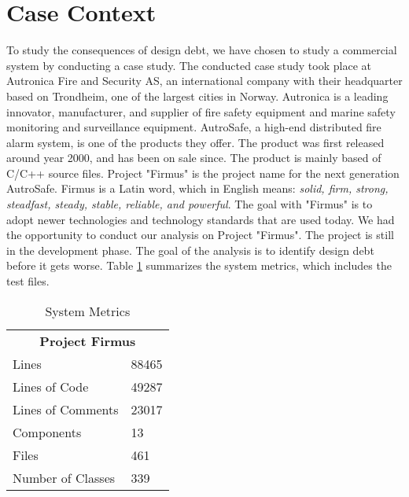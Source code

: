 \section{Case Context}
\label{sec:casecontext}
To study the consequences of design debt, we have chosen to study a commercial system by conducting a case study. The conducted case study took place at Autronica Fire and Security AS, an international company with their headquarter based on Trondheim, one of the largest cities in Norway. Autronica is a leading innovator, manufacturer, and supplier of fire safety equipment and marine safety monitoring and surveillance equipment. AutroSafe, a high-end distributed fire alarm system, is one of the products they offer. The product was first released around year 2000, and has been on sale since. The product is mainly based of C/C++ source files. Project "Firmus" is the project name for the next generation AutroSafe. Firmus is a Latin word, which in English means: \textit{solid, firm, strong, steadfast, steady, stable, reliable, and powerful}. The goal with "Firmus" is to adopt newer technologies and technology standards that are used today. We had the opportunity to conduct our analysis on Project "Firmus". The project is still in the development phase. The goal of the analysis is to identify design debt before it gets worse. Table \ref{tab:systemmetrics} summarizes the system metrics, which includes the test files.


\begin{table}[]
\centering
\caption{System Metrics}
\label{tab:systemmetrics}
\begin{tabular}{|l|l|}
\multicolumn{2}{c}{\textbf{Project Firmus}} \\
Lines                      & 88465          \\
Lines of Code              & 49287          \\
Lines of Comments          & 23017          \\
Components                 & 13             \\
Files                      & 461            \\
Number of Classes          & 339           
\end{tabular}
\end{table}

